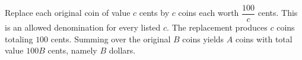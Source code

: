 Replace each original coin of value $c$ cents by $c$ coins each worth $\dfrac{100}{c}$ cents. This is an allowed denomination for every listed $c$. The replacement produces $c$ coins totaling $100$ cents. Summing over the original $B$ coins yields $A$ coins with total value $100B$ cents, namely $B$ dollars.
